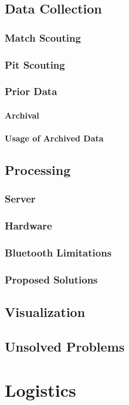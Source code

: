 \documentclass[11pt]{report}
\begin{document}
\section{Data Collection}
\subsection{Match Scouting}
\subsection{Pit Scouting}
\subsection{Prior Data}
\subsubsection{Archival}
\subsubsection{Usage of Archived Data}

\section{Processing}
\subsection {Server}
\subsection{Hardware}
\subsection{Bluetooth Limitations}
\subsection{Proposed Solutions}

\section{Visualization}

\section{Unsolved Problems}

\chapter{Logistics}
\end{document}
